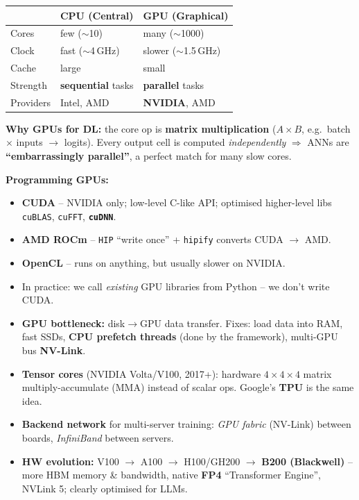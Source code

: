 \documentclass[10pt,a4paper]{article}
\begin{document}
	\begin{center}
	\begin{tabular}{@{}lll@{}}
		\toprule
		& \textbf{CPU} (Central) & \textbf{GPU} (Graphical) \\
		\midrule
		Cores       & few ($\sim$10) & many ($\sim$1000) \\
		Clock       & fast ($\sim$4\,GHz) & slower ($\sim$1.5\,GHz) \\
		Cache       & large & small \\
		Strength    & \textbf{sequential} tasks & \textbf{parallel} tasks \\
		Providers   & Intel, AMD & \textbf{NVIDIA}, AMD \\
		\bottomrule
	\end{tabular}
	\end{center}

	\begin{importantbox}
		\textbf{Why GPUs for DL:} the core op is \textbf{matrix multiplication} ($A\times B$, e.g.\ batch $\times$ inputs $\to$ logits). Every output cell is computed \emph{independently} $\Rightarrow$ ANNs are \textbf{``embarrassingly parallel''}, a perfect match for many slow cores.
	\end{importantbox}

	\textbf{Programming GPUs:}
	\begin{itemize}[leftmargin=*]
		\item \textbf{CUDA} -- NVIDIA only; low-level C-like API; optimised higher-level libs \texttt{cuBLAS}, \texttt{cuFFT}, \textbf{\texttt{cuDNN}}.
		\item \textbf{AMD ROCm} -- \texttt{HIP} ``write once'' + \texttt{hipify} converts CUDA $\to$ AMD.
		\item \textbf{OpenCL} -- runs on anything, but usually slower on NVIDIA.
		\item In practice: we call \emph{existing} GPU libraries from Python -- we don't write CUDA.
	\end{itemize}

	\begin{itemize}[leftmargin=*]
		\item \textbf{GPU bottleneck:} disk$\to$GPU data transfer. Fixes: load data into RAM, fast SSDs, \textbf{CPU prefetch threads} (done by the framework), multi-GPU bus \textbf{NV-Link}.
		\item \textbf{Tensor cores} (NVIDIA Volta/V100, 2017+): hardware $4{\times}4{\times}4$ matrix multiply-accumulate (MMA) instead of scalar ops. Google's \textbf{TPU} is the same idea.
		\item \textbf{Backend network} for multi-server training: \emph{GPU fabric} (NV-Link) between boards, \emph{InfiniBand} between servers.
		\item \textbf{HW evolution:} V100 $\to$ A100 $\to$ H100/GH200 $\to$ \textbf{B200 (Blackwell)} -- more HBM memory \& bandwidth, native \textbf{FP4} ``Transformer Engine'', NVLink 5; clearly optimised for LLMs.
	\end{itemize}
\end{document}
